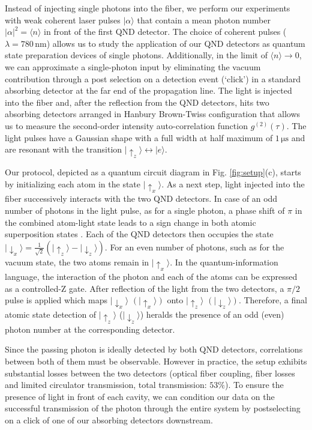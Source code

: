 \documentclass[prl,amsmath,amssymb,bibnotes,aps,longbibliography,12pt]{revtex4-1}
\newcommand{\ket}[1]{|{#1}\rangle}
\newcommand{\braket}[1]{\langle{#1}\rangle}
\begin{document}
Instead of injecting single photons into the fiber, we perform our experiments with weak coherent laser pulses $\ket{\alpha}$ that contain a mean photon number $\vert\alpha\vert^2=\braket{n}$ in front of the first QND detector. The choice of coherent pulses ($\lambda=780\,\mathrm{nm}$) allows us to study the application of our QND detectors as quantum state preparation devices of single photons. Additionally, in the limit of $\braket{n}\rightarrow 0$, we can approximate a single-photon input by eliminating the vacuum contribution through a post selection on a detection event (`click') in a standard absorbing detector at the far end of the propagation line. The light is injected into the fiber and, after the reflection from the QND detectors, hits two absorbing detectors arranged in Hanbury Brown-Twiss configuration that allows us to measure the second-order intensity auto-correlation function $g^{(2)}(\tau)$. The light pulses have a Gaussian shape with a full width at half maximum of $1\,\mathrm{\mu s}$ and are resonant with the transition $\ket{\uparrow_z}\leftrightarrow\ket{e}$.

Our protocol, depicted as a quantum circuit diagram in Fig. \ref{fig:setup}(c), starts by initializing each atom in the state $\ket{\uparrow_x}$. As a next step, light injected into the fiber successively interacts with the two QND detectors. In case of an odd number of photons in the light pulse, as for a single photon, a phase shift of $\pi$ in the combined atom-light state leads to a sign change in both atomic superposition states \cite{duan2004, xiao2004, reiserer2013, tiecke2014}. Each of the QND detectors then occupies the state $\ket{\downarrow_x}=\frac{1}{\sqrt{2}}(\ket{\uparrow_z}-\ket{\downarrow_z})$. For an even number of photons, such as for the vacuum state, the two atoms remain in $\ket{\uparrow_x}$. In the quantum-information language, the interaction of the photon and each of the atoms can be expressed as a controlled-Z gate. After reflection of the light from the two detectors, a $\pi/2$ pulse is applied which maps $\ket{\downarrow_x}$ $(\ket{\uparrow_x})$ onto $\ket{\uparrow_z}$ $(\ket{\downarrow_z})$. Therefore, a final atomic state detection of $\ket{\uparrow_z}$ ($\ket{\downarrow_z}$) heralds the presence of an odd (even) photon number at the corresponding detector.

Since the passing photon is ideally detected by both QND detectors, correlations between both of them must be observable. However in practice, the setup exhibits substantial losses between the two detectors (optical fiber coupling, fiber losses and limited circulator transmission, total transmission: $53\%$). To ensure the presence of light in front of each cavity, we can condition our data on the successful transmission of the photon through the entire system by postselecting on a click of one of our absorbing detectors downstream.
\end{document}
